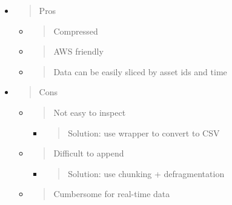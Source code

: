 \documentclass[11pt, reqno]{amsart}
\begin{document}
\begin{itemize}
\item
  \begin{quote}
  Pros
  \end{quote}

  \begin{itemize}
  \item
    \begin{quote}
    Compressed
    \end{quote}
  \item
    \begin{quote}
    AWS friendly
    \end{quote}
  \item
    \begin{quote}
    Data can be easily sliced by asset ids and time
    \end{quote}
  \end{itemize}
\item
  \begin{quote}
  Cons
  \end{quote}

  \begin{itemize}
  \item
    \begin{quote}
    Not easy to inspect
    \end{quote}

    \begin{itemize}
    \item
      \begin{quote}
      Solution: use wrapper to convert to CSV
      \end{quote}
    \end{itemize}
  \item
    \begin{quote}
    Difficult to append
    \end{quote}

    \begin{itemize}
    \item
      \begin{quote}
      Solution: use chunking + defragmentation
      \end{quote}
    \end{itemize}
  \item
    \begin{quote}
    Cumbersome for real-time data
    \end{quote}
  \end{itemize}
\end{itemize}
\end{document}
